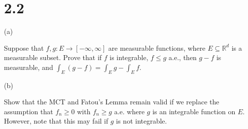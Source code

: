 \documentclass[10pt]{article}
\newenvironment{problem}[2][Problem]{\begin{trivlist}
\item[\hskip \labelsep {\bfseries #1}\hskip \labelsep {\bfseries #2.}]}{\end{trivlist}}
\begin{document}
\section*{2.2}

\begin{problem}{4.4.17}

(a)

Suppose that $f,g: E \to [-\infty,\infty]$ are measurable functions, where $E \subseteq \mathbb{R}^d$ is a measurable subset. Prove that if $f$ is integrable, $f \leq g$ a.e., then $g-f$ is measurable, and $\int_E (g-f) = \int_E g - \int_E f$.

(b)

Show that the MCT and Fatou's Lemma remain valid if we replace the assumption that $f_n \geq 0$ with $f_n \geq g$ a.e. where $g$ is an integrable function on $E$. However, note that this may fail if $g$ is not integrable.

\end{problem}
\end{document}
